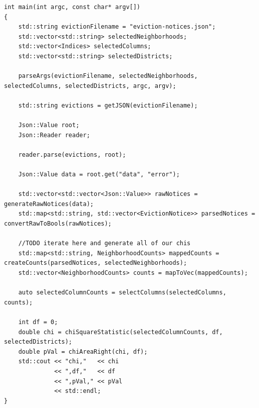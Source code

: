 \documentclass[]{article}
\begin{document}
\begin{lstlisting}
int main(int argc, const char* argv[])
{
    std::string evictionFilename = "eviction-notices.json";
    std::vector<std::string> selectedNeighborhoods;
    std::vector<Indices> selectedColumns;
    std::vector<std::string> selectedDistricts;

    parseArgs(evictionFilename, selectedNeighborhoods, selectedColumns, selectedDistricts, argc, argv);

    std::string evictions = getJSON(evictionFilename);

    Json::Value root;
    Json::Reader reader;

    reader.parse(evictions, root);

    Json::Value data = root.get("data", "error");

    std::vector<std::vector<Json::Value>> rawNotices = generateRawNotices(data);
    std::map<std::string, std::vector<EvictionNotice>> parsedNotices = convertRawToBools(rawNotices);
    
    //TODO iterate here and generate all of our chis
    std::map<std::string, NeighborhoodCounts> mappedCounts = createCounts(parsedNotices, selectedNeighborhoods);
    std::vector<NeighborhoodCounts> counts = mapToVec(mappedCounts);

    auto selectedColumnCounts = selectColumns(selectedColumns, counts);

    int df = 0;
    double chi = chiSquareStatistic(selectedColumnCounts, df, selectedDistricts);
    double pVal = chiAreaRight(chi, df);
    std::cout << "chi,"   << chi 
              << ",df,"   << df
              << ",pVal," << pVal
              << std::endl;
}
\end{lstlisting}
\end{document}
